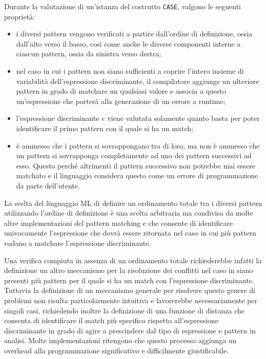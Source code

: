 Durante la valutazione di un'istanza del costrutto \texttt{CASE}, valgono le
seguenti proprietà:

\begin{itemize}

\item i diversi pattern vengono verificati a partire dall’ordine di definizione,
ossia dall’alto verso il basso, così come anche le diverse componenti interne a
ciascun pattern, ossia da sinistra verso destra;

\item nel caso in cui i pattern non siano sufficienti a coprire l’intero insieme
di variabilità dell’espressione discriminante, il compilatore aggiunge un
ulteriore pattern in grado di matchare un qualsiasi valore e associa a questo
un’espressione che porterà alla generazione di un errore a runtime;

\item l’espressione discriminante $e$ viene valutata solamente quanto basta per
poter identificare il primo pattern con il quale si ha un match;

\item é ammesso che i pattern si sovrappongano tra di loro, ma non è ammesso che
un pattern si sovrapponga completamente ad uno dei pattern successivi ad esso.
Questo perché altrimenti il pattern successivo non potrebbe mai essere matchato
e il linguaggio considera questo come un errore di programmazione da parte
dell'utente.

\end{itemize}

La scelta del linguaggio ML di definire un ordinamento totale tra i diversi
pattern utilizzando l’ordine di definizione è una scelta arbitraria ma condivisa
da molte altre implementazioni del pattern matching e che consente di
identificare univocamente l'espressione che dovrà essere ritornata nel caso in
cui più pattern vadano a matchare l'espressione discriminante.

Una verifica compiuta in assenza di un ordinamento totale richiederebbe infatti
la definizione un altro meccanismo per la risoluzione dei conflitti nel caso in
siano presenti più pattern per il quale si ha un match con l’espressione
discriminante. Tuttavia la definizione di un meccanismo generale per risolvere
questo genere di problemi non risulta particolarmente intuitiva e lavorerebbe
necessariamente per singoli casi, richiedendo inoltre la definizione di una
funzione di distanza che consenta di identificare il match più specifico
rispetto all’espressione discriminante in grado di agire a prescindere dal tipo
di espressione e pattern in analisi. Molte implementazioni ritengono che questo
processo aggiunga un overhead alla programmazione significativo e difficilmente
giustificabile.

